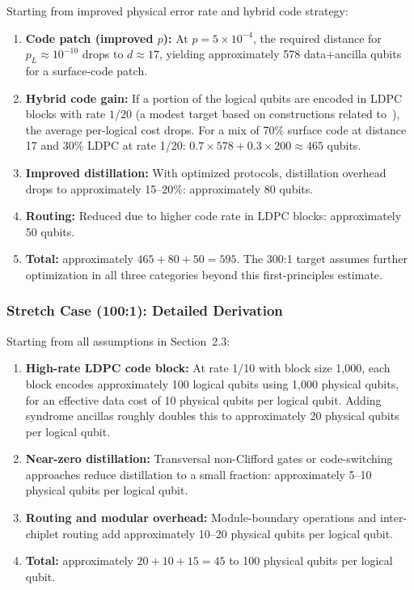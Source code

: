 \documentclass[conference]{IEEEtran}
\begin{document}
Starting from improved physical error rate and hybrid code strategy:

\begin{enumerate}
\item \textbf{Code patch (improved $p$):} At $p = 5 \times 10^{-4}$, the required distance for $p_L \approx 10^{-10}$ drops to $d \approx 17$, yielding approximately 578 data+ancilla qubits for a surface-code patch.
\item \textbf{Hybrid code gain:} If a portion of the logical qubits are encoded in LDPC blocks with rate $1/20$ (a modest target based on constructions related to~\cite{bravyi2024, panteleev2022}), the average per-logical cost drops. For a mix of 70\% surface code at distance 17 and 30\% LDPC at rate 1/20: $0.7 \times 578 + 0.3 \times 200 \approx 465$ qubits.
\item \textbf{Improved distillation:} With optimized protocols, distillation overhead drops to approximately 15--20\%: approximately 80 qubits.
\item \textbf{Routing:} Reduced due to higher code rate in LDPC blocks: approximately 50 qubits.
\item \textbf{Total:} approximately $465 + 80 + 50 = 595$. The 300:1 target assumes further optimization in all three categories beyond this first-principles estimate.
\end{enumerate}

\subsubsection{Stretch Case (100:1): Detailed Derivation}

Starting from all assumptions in Section~2.3:

\begin{enumerate}
\item \textbf{High-rate LDPC code block:} At rate 1/10 with block size 1,000, each block encodes approximately 100 logical qubits using 1,000 physical qubits, for an effective data cost of 10 physical qubits per logical qubit. Adding syndrome ancillas roughly doubles this to approximately 20 physical qubits per logical qubit.
\item \textbf{Near-zero distillation:} Transversal non-Clifford gates or code-switching approaches reduce distillation to a small fraction: approximately 5--10 physical qubits per logical qubit.
\item \textbf{Routing and modular overhead:} Module-boundary operations and inter-chiplet routing add approximately 10--20 physical qubits per logical qubit.
\item \textbf{Total:} approximately $20 + 10 + 15 = 45$ to 100 physical qubits per logical qubit.
\end{enumerate}
\end{document}

